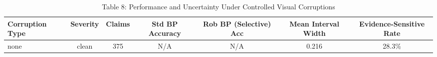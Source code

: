 \begin{table}[htbp]
\centering
\caption{Table 8: Performance and Uncertainty Under Controlled Visual Corruptions}
\label{tab:table8_corruption_robustness}
\begin{tabular}{lcccccc}
\hline
Corruption Type & Severity & Claims & Std BP Accuracy & Rob BP (Selective) Acc & Mean Interval Width & Evidence-Sensitive Rate \\
\hline
none & clean & 375 & N/A & N/A & 0.216 & 28.3\% \\
\hline
\end{tabular}
\end{table}